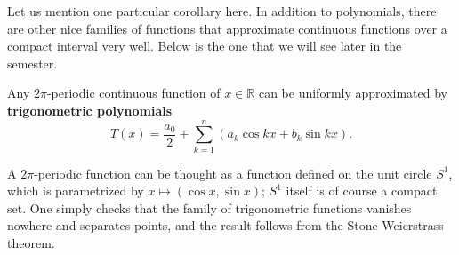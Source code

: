 \documentclass[11pt]{article}
\begin{document}
Let us mention one particular corollary here.
In addition to polynomials, there are other nice families of functions that approximate continuous functions over a compact interval very well.
Below is the one that we will see later in the semester.

\begin{cor}
  Any $2\pi$-periodic continuous function of $x \in \mathbb{R}$ can be uniformly approximated by \textbf{trigonometric polynomials}
  \[
    T(x) = \frac{a_0}{2} + \sum_{k=1}^n \left( a_k \cos kx + b_k \sin kx \right).
  \]
\end{cor}

A $2\pi$-periodic function can be thought as a function defined on the unit circle $S^1$, which is parametrized by $x \mapsto (\cos x, \sin x)$; $S^1$ itself is of course a compact set.
One simply checks that the family of trigonometric functions vanishes nowhere and separates points, and the result follows from the Stone-Weierstrass theorem.
\end{document}
